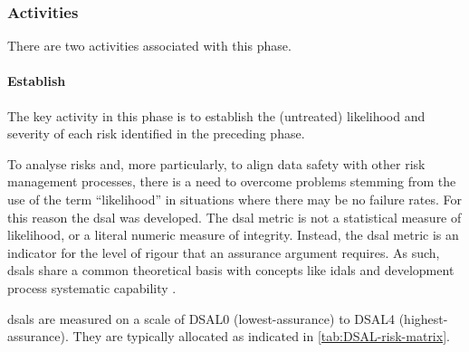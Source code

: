 \subsubsection{Activities}
There are two activities associated with this phase.
%
\paragraph{Establish }
\label{bkm:DSAL-table-section}
The key activity in this phase is to establish the (untreated) likelihood and severity of each risk identified in the preceding phase.

To analyse risks and, more particularly, to align data safety with other risk management processes, there is a need to overcome problems stemming from the use of the term ``likelihood'' in situations where there may be no failure rates. For this reason the \gls{dsal} was developed. The \gls{dsal} metric is not a statistical measure of likelihood, or a literal numeric measure of \gls{integrity}. Instead, the \gls{dsal} metric is an indicator for the level of rigour that an assurance argument requires. As such, \glspl{dsal} share a common theoretical basis with concepts like \glspl{idal}  \cite{citation:arp4754a2010guidelines} and development process systematic capability \cite{citation:iec615083}.

\glspl{dsal} are measured on a scale of DSAL0 (lowest-assurance) to DSAL4 (highest-assurance). They are typically allocated as indicated in \autoref{tab:DSAL-risk-matrix}.

